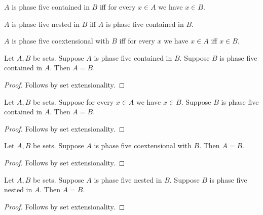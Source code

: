 \begin{definition}\label{phase5_contained}
    $A$ is phase five contained in $B$ iff
    for every $x\in A$ we have $x\in B$.
\end{definition}

\begin{abbreviation}\label{phase5_nested}
    $A$ is phase five nested in $B$ iff
    $A$ is phase five contained in $B$.
\end{abbreviation}

\begin{definition}\label{phase5_coextensional}
    $A$ is phase five coextensional with $B$ iff
    for every $x$ we have $x\in A$ iff $x\in B$.
\end{definition}

\begin{proposition}\label{definition_set_extensionality}
    Let $A,B$ be sets.
    Suppose $A$ is phase five contained in $B$.
    Suppose $B$ is phase five contained in $A$.
    Then $A=B$.
\end{proposition}
\begin{proof}
    Follows by set extensionality.
\end{proof}

\begin{proposition}\label{mixed_definition_set_extensionality}
    Let $A,B$ be sets.
    Suppose for every $x\in A$ we have $x\in B$.
    Suppose $B$ is phase five contained in $A$.
    Then $A=B$.
\end{proposition}
\begin{proof}
    Follows by set extensionality.
\end{proof}

\begin{proposition}\label{definition_iff_set_extensionality}
    Let $A,B$ be sets.
    Suppose $A$ is phase five coextensional with $B$.
    Then $A=B$.
\end{proposition}
\begin{proof}
    Follows by set extensionality.
\end{proof}

\begin{proposition}\label{chained_definition_set_extensionality}
    Let $A,B$ be sets.
    Suppose $A$ is phase five nested in $B$.
    Suppose $B$ is phase five nested in $A$.
    Then $A=B$.
\end{proposition}
\begin{proof}
    Follows by set extensionality.
\end{proof}
